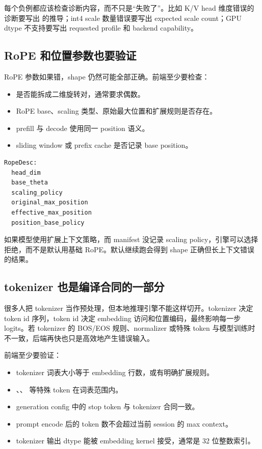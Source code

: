每个负例都应该检查诊断内容，而不只是“失败了”。比如 K/V head 维度错误的诊断要写出  的推导；int4 scale 数量错误要写出 expected scale count；GPU dtype 不支持要写出 requested profile 和 backend capability。

\subsection{RoPE 和位置参数也要验证}

RoPE 参数如果错，shape 仍然可能全部正确。前端至少要检查：

\begin{itemize}
  \item {} 是否能拆成二维旋转对，通常要求偶数。
  \item RoPE base、scaling 类型、原始最大位置和扩展规则是否存在。
  \item prefill 与 decode 使用同一 position 语义。
  \item sliding window 或 prefix cache 是否记录 base position。
\end{itemize}

\begin{lstlisting}[numbers=none,caption={RoPE verifier 字段}]
RopeDesc:
  head_dim
  base_theta
  scaling_policy
  original_max_position
  effective_max_position
  position_base_policy
\end{lstlisting}

如果模型使用扩展上下文策略，而 manifest 没记录 scaling policy，引擎可以选择拒绝，而不是默认用基础 RoPE。默认继续跑会得到 shape 正确但长上下文错误的结果。

\subsection{tokenizer 也是编译合同的一部分}

很多人把 tokenizer 当作预处理，但本地推理引擎不能这样切开。tokenizer 决定 token id 序列，token id 决定 embedding 访问和位置编码，最终影响每一步 logits。若 tokenizer 的 BOS/EOS 规则、normalizer 或特殊 token 与模型训练时不一致，后端再快也只是高效地产生错误输入。

前端至少要验证：

\begin{itemize}
  \item tokenizer 词表大小等于 embedding 行数，或有明确扩展规则。
  \item {}、、 等特殊 token 在词表范围内。
  \item generation config 中的 stop token 与 tokenizer 合同一致。
  \item prompt encode 后的 token 数不会超过当前 session 的 max context。
  \item tokenizer 输出 dtype 能被 embedding kernel 接受，通常是 32 位整数索引。
\end{itemize}


